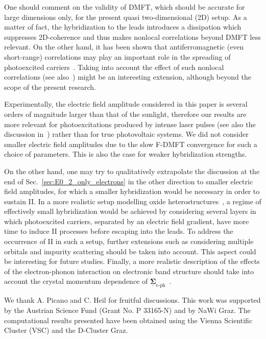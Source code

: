 \documentclass[aps,prb,groupedaddress,showpacs,twocolumn,superscriptaddress,10pt]{revtex4-2}
\newcommand{\mat}[1]{\bm{#1}} %
\newcommand{\kel}[1]{\underline{#1}} %
\begin{document}
One should comment on the validity of DMFT, which should be accurate for large dimensions only, for the present quasi two-dimensional (2D) setup. As a matter of fact, the hybridization to the leads introduces a dissipation which suppresses 2D-coherence and thus makes nonlocal correlations beyond DMFT less relevant.
On the other hand, it has been shown that antiferromagnetic (even short-range) correlations may play an important role in the spreading of photoexcited carriers~\cite{ec.we.14}. 
Taking into account the effect of such nonlocal correlations (see also~\cite{ro.ha.18}) might be an interesting extension, although beyond the scope of the present research.

Experimentally, the electric field amplitude considered in this paper is several orders of magnitude larger than that of the sunlight, therefore our results are more relevant for photoexcitations produced by intense laser pulses (see also the discussion in~\cite{mu.we.18}) rather than for true photovoltaic systems. We did not consider smaller electric field amplitudes due to the slow F-DMFT convergence for such a choice of parameters. This is also the case for weaker hybridization strengths. 
 
On the other hand, one may try to qualitatively extrapolate the discussion at the end of Sec.~\ref{sec:E0_2_only_electrons} in the other direction to smaller electric field amplitudes, for which a smaller hybridization would be necessary in order to sustain II. In a more realistic setup modelling oxide heterostructures~\cite{as.bl.13,pe.be.19}, a regime of effectively small hybridization would be achieved by considering several layers in which photoexcited carriers, separated by an electric field gradient, have more time to induce II processes before escaping into the leads. To address the occurrence of II in such a setup, further extensions such as considering multiple orbitals and impurity scattering should be taken into account. This aspect could be interesting for future studies.    
Finally, a more realistic description of the effects of the electron-phonon interaction on electronic band structure should take into account the crystal momentum dependence of $\kel{\mat{\Sigma}}_{\text{e-ph}}$~\cite{gius.17}. 
     
    
\acknowledgments  

We thank A. Picano and C. Heil for fruitful discussions. This work was supported by the Austrian Science Fund (Grant No. P 33165-N) and by NaWi Graz. The computational results presented have been obtained using the Vienna Scientific Cluster (VSC) and the D-Cluster Graz.
   
      
 
 
\end{document}
